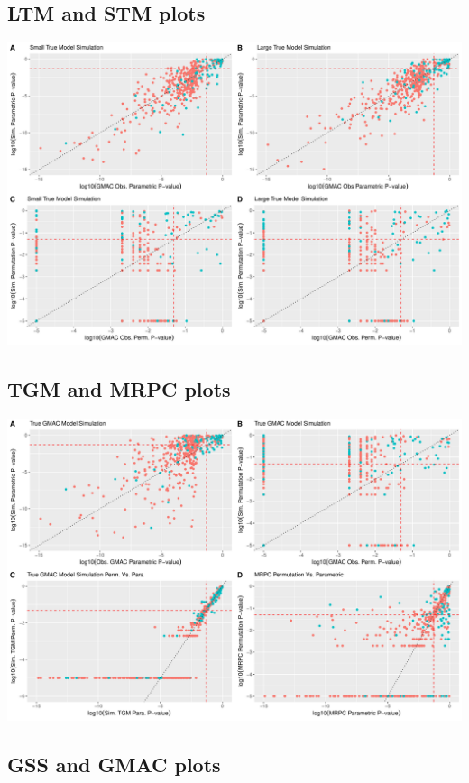 \documentclass[
]{article}
\begin{document}
\hypertarget{ltm-and-stm-plots}{%
\subsection{LTM and STM plots}\label{ltm-and-stm-plots}}

\includegraphics{GMACwriteup_files/figure-latex/unnamed-chunk-6-1.pdf}

\hypertarget{tgm-and-mrpc-plots}{%
\subsection{TGM and MRPC plots}\label{tgm-and-mrpc-plots}}

\includegraphics{GMACwriteup_files/figure-latex/unnamed-chunk-7-1.pdf}

\hypertarget{gss-and-gmac-plots}{%
\subsection{GSS and GMAC plots}\label{gss-and-gmac-plots}}
\end{document}
